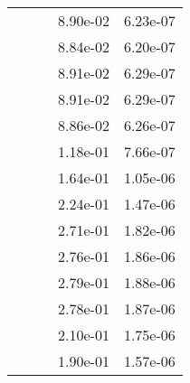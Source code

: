 \begin{table}
\begin{tabular}{c|cc|cc|}
\multicolumn{1}{|c|}{} & \multicolumn{1}{|c|}{} & \multicolumn{1}{|c|}{} & \multicolumn{1}{|c|}{  8.90e-02} & \multicolumn{1}{|c|}{  6.23e-07} \\ 
\multicolumn{1}{|c|}{} & \multicolumn{1}{|c|}{} & \multicolumn{1}{|c|}{} & \multicolumn{1}{|c|}{  8.84e-02} & \multicolumn{1}{|c|}{  6.20e-07} \\ 
\multicolumn{1}{|c|}{} & \multicolumn{1}{|c|}{} & \multicolumn{1}{|c|}{} & \multicolumn{1}{|c|}{  8.91e-02} & \multicolumn{1}{|c|}{  6.29e-07} \\ 
\multicolumn{1}{|c|}{} & \multicolumn{1}{|c|}{} & \multicolumn{1}{|c|}{} & \multicolumn{1}{|c|}{  8.91e-02} & \multicolumn{1}{|c|}{  6.29e-07} \\ 
\multicolumn{1}{|c|}{} & \multicolumn{1}{|c|}{} & \multicolumn{1}{|c|}{} & \multicolumn{1}{|c|}{  8.86e-02} & \multicolumn{1}{|c|}{  6.26e-07} \\ 
\multicolumn{1}{|c|}{} & \multicolumn{1}{|c|}{} & \multicolumn{1}{|c|}{} & \multicolumn{1}{|c|}{  1.18e-01} & \multicolumn{1}{|c|}{  7.66e-07} \\ 
\multicolumn{1}{|c|}{} & \multicolumn{1}{|c|}{} & \multicolumn{1}{|c|}{} & \multicolumn{1}{|c|}{  1.64e-01} & \multicolumn{1}{|c|}{  1.05e-06} \\ 
\multicolumn{1}{|c|}{} & \multicolumn{1}{|c|}{} & \multicolumn{1}{|c|}{} & \multicolumn{1}{|c|}{  2.24e-01} & \multicolumn{1}{|c|}{  1.47e-06} \\ 
\multicolumn{1}{|c|}{} & \multicolumn{1}{|c|}{} & \multicolumn{1}{|c|}{} & \multicolumn{1}{|c|}{  2.71e-01} & \multicolumn{1}{|c|}{  1.82e-06} \\ 
\multicolumn{1}{|c|}{} & \multicolumn{1}{|c|}{} & \multicolumn{1}{|c|}{} & \multicolumn{1}{|c|}{  2.76e-01} & \multicolumn{1}{|c|}{  1.86e-06} \\ 
\multicolumn{1}{|c|}{} & \multicolumn{1}{|c|}{} & \multicolumn{1}{|c|}{} & \multicolumn{1}{|c|}{  2.79e-01} & \multicolumn{1}{|c|}{  1.88e-06} \\ 
\multicolumn{1}{|c|}{} & \multicolumn{1}{|c|}{} & \multicolumn{1}{|c|}{} & \multicolumn{1}{|c|}{  2.78e-01} & \multicolumn{1}{|c|}{  1.87e-06} \\ 
\multicolumn{1}{|c|}{} & \multicolumn{1}{|c|}{} & \multicolumn{1}{|c|}{} & \multicolumn{1}{|c|}{  2.10e-01} & \multicolumn{1}{|c|}{  1.75e-06} \\ 
\multicolumn{1}{|c|}{} & \multicolumn{1}{|c|}{} & \multicolumn{1}{|c|}{} & \multicolumn{1}{|c|}{  1.90e-01} & \multicolumn{1}{|c|}{  1.57e-06} \\ 

\end{tabular}
\end{table}
